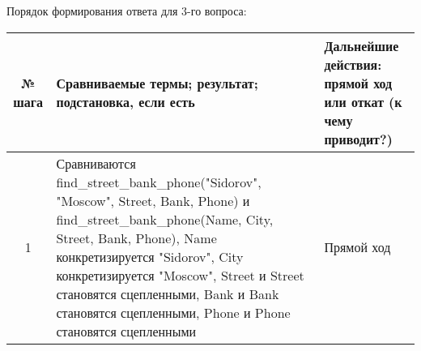 \documentclass[a4paper,12pt]{article}
\begin{document}
Порядок формирования ответа для 3-го вопроса:
\begin{table}[ht!] 
	\begin{tabularx}{\linewidth}{|c|>{\centering}X|>{\centering}X|}
		\hline
		№ шага & Сравниваемые термы; результат; подстановка, если есть & Дальнейшие действия: прямой ход или откат (к чему приводит?)\tabularnewline
		\hline
		1 & Сравниваются find\_street\_bank\_phone("Sidorov"{}, "Moscow"{}, Street, Bank, Phone) и find\_street\_bank\_phone(Name, City, Street, Bank, Phone), Name конкретизируется "Sidorov"{}, City конкретизируется "Moscow"{}, Street и Street становятся сцепленными, Bank и Bank становятся сцепленными, Phone и Phone становятся сцепленными & Прямой ход \tabularnewline
		\hline
								\end{tabularx}
	\end{table}
\newpage
\end{document}

